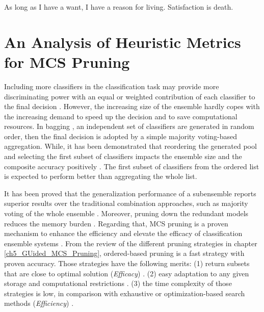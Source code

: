 



\begin{savequote}[50mm]
As long as I have a want, I have a reason for living. Satisfaction is death.  
\end{savequote}


\chapter{An Analysis of Heuristic Metrics for MCS Pruning}
\label{cha:6_our_proposal}

Including more classifiers in the classification task may provide more discriminating power with an equal or weighted contribution of each classifier to the final decision \cite{cao2018}. However, the increasing size of the ensemble hardly copes with the increasing demand to speed up the decision and to save computational resources. In bagging \cite{breiman1996}, an independent set of classifiers are generated in random order, then the final decision is adopted by a simple majority voting-based aggregation. While, it has been demonstrated that reordering the generated pool and selecting the first subset of classifiers impacts the ensemble size and the composite accuracy positively \cite{cao2018,martinez2004,martinez2009, guo2013, guo2018,lu2010}. The first subset of classifiers from the ordered list is expected to perform better than aggregating the whole list. 

It has been proved that the generalization performance of a subensemble reports superior results over the traditional combination approaches, such as majority voting of the whole ensemble \cite{martinez2009,zhou2002}.
Moreover, pruning down the redundant models reduces the memory burden \cite{diao2013}. Regarding that, MCS pruning is a proven mechanism to enhance the efficiency and elevate the efficacy of classification ensemble systems \cite{cao2018,martinez2009,guo2013, lu2010}. From the review of the different pruning strategies in chapter \ref{ch5_GUided_MCS_Pruning}, ordered-based pruning is a fast strategy with proven accuracy. Those strategies
have the following merits: (1)           return subsets that are close to optimal solution (\textit{Efficacy}) \cite{martinez2009}.
   (2)  easy adaptation to any given storage and computational restrictions \cite{cao2018,guo2018}.
    (3) the time complexity of those strategies is low, in comparison with exhaustive or optimization-based search methods (\textit{Efficiency}) \cite{martinez2009}.
 

